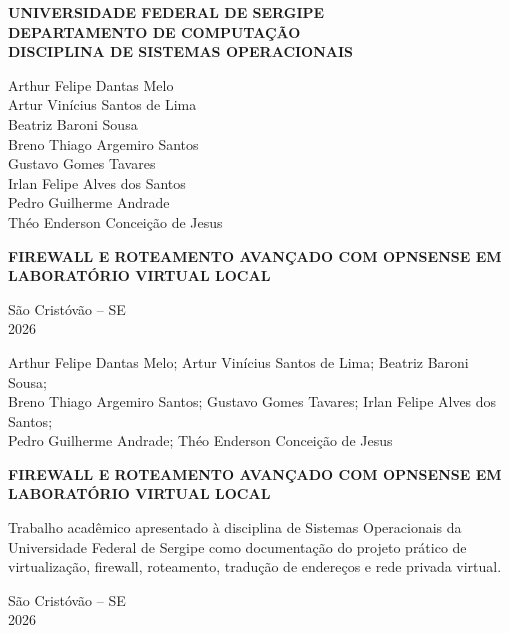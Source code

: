 \documentclass[12pt,a4paper]{article}
\begin{document}
\begin{titlepage}
\begin{center}
\textbf{UNIVERSIDADE FEDERAL DE SERGIPE}\\
\textbf{DEPARTAMENTO DE COMPUTAÇÃO}\\
\textbf{DISCIPLINA DE SISTEMAS OPERACIONAIS}
\vspace{1.5cm}

Arthur Felipe Dantas Melo\\Artur Vinícius Santos de Lima\\
Beatriz Baroni Sousa\\Breno Thiago Argemiro Santos\\
Gustavo Gomes Tavares\\Irlan Felipe Alves dos Santos\\
Pedro Guilherme Andrade\\Théo Enderson Conceição de Jesus

\vfill
{\Large\bfseries FIREWALL E ROTEAMENTO AVANÇADO COM OPNSENSE EM LABORATÓRIO VIRTUAL LOCAL\par}
\vfill
São Cristóvão -- SE\\2026
\end{center}
\end{titlepage}

\begin{titlepage}
\begin{center}
Arthur Felipe Dantas Melo; Artur Vinícius Santos de Lima; Beatriz Baroni Sousa;\\
Breno Thiago Argemiro Santos; Gustavo Gomes Tavares; Irlan Felipe Alves dos Santos;\\
Pedro Guilherme Andrade; Théo Enderson Conceição de Jesus
\vfill
{\Large\bfseries FIREWALL E ROTEAMENTO AVANÇADO COM OPNSENSE EM LABORATÓRIO VIRTUAL LOCAL\par}
\vspace{2cm}
\begin{flushright}\begin{minipage}{.54\textwidth}
Trabalho acadêmico apresentado à disciplina de Sistemas Operacionais da
Universidade Federal de Sergipe como documentação do projeto prático de
virtualização, firewall, roteamento, tradução de endereços e rede privada virtual.
\end{minipage}\end{flushright}
\vfill São Cristóvão -- SE\\2026
\end{center}
\end{titlepage}
\end{document}
